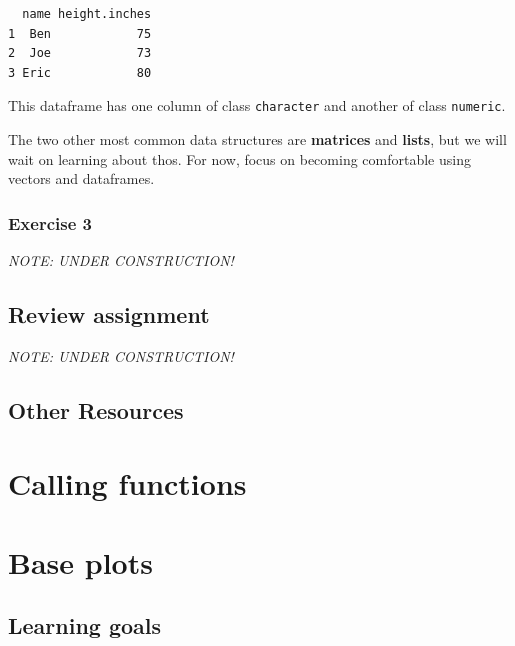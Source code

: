 \documentclass[
]{book}
\begin{document}
\begin{verbatim}
  name height.inches
1  Ben            75
2  Joe            73
3 Eric            80
\end{verbatim}

This dataframe has one column of class \texttt{character} and another of class \texttt{numeric}.

The two other most common data structures are \textbf{matrices} and \textbf{lists}, but we will wait on learning about thos. For now, focus on becoming comfortable using vectors and dataframes.

\hypertarget{exercise-3-3}{%
\subsection*{Exercise 3}\label{exercise-3-3}}

\emph{NOTE: UNDER CONSTRUCTION!}

\hypertarget{review-assignment-3}{%
\section*{Review assignment}\label{review-assignment-3}}

\emph{NOTE: UNDER CONSTRUCTION!}

\hypertarget{other-resources-3}{%
\section*{Other Resources}\label{other-resources-3}}

\hypertarget{calling-functions}{%
\chapter{Calling functions}\label{calling-functions}}

\hypertarget{base-plots}{%
\chapter{Base plots}\label{base-plots}}

\hypertarget{learning-goals-4}{%
\section*{Learning goals}\label{learning-goals-4}}
\end{document}
